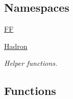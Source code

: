 \subsection*{Namespaces}
\begin{DoxyCompactItemize}
\item 
 \mbox{\hyperlink{namespaceFF}{FF}}
\item 
 \mbox{\hyperlink{namespaceHadron}{Hadron}}
\begin{DoxyCompactList}\small\item\em Helper functions. \end{DoxyCompactList}\end{DoxyCompactItemize}
\subsection*{Functions}
